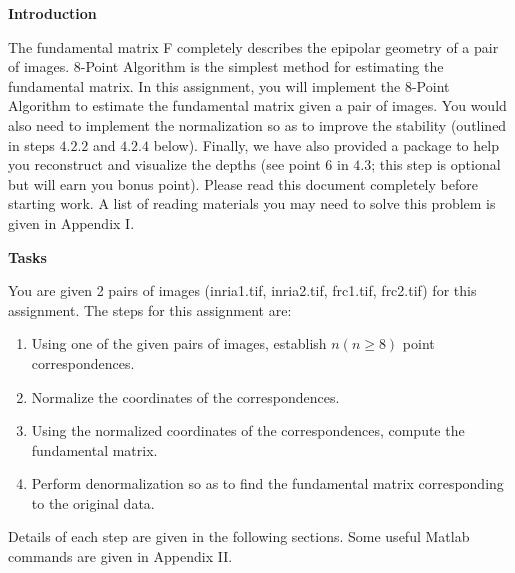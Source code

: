 \begin{questions}
\question
\textbf{Introduction}

The fundamental matrix F completely describes the epipolar geometry of a pair of images. 8-Point Algorithm is the simplest method for estimating the fundamental matrix. In this assignment, you will implement the 8-Point Algorithm to estimate the fundamental matrix given a pair of images. You would also need to implement the normalization so as to improve the stability (outlined in steps $4.2.2$ and $4.2.4$ below). Finally, we have also provided a package to help you reconstruct and visualize the depths (see point $6$ in $4.3$; this step is optional but will earn you bonus point). Please read this document completely before starting work. A list of reading materials you may need to solve this problem is given in Appendix I.

\question
\textbf{Tasks}

You are given 2 pairs of images (inria1.tif, inria2.tif, frc1.tif, frc2.tif) for this assignment. The steps for this assignment are:
\begin{enumerate}
    \item 
    Using one of the given pairs of images, establish $n (n \geq 8)$ point correspondences.
    
    \item
    Normalize the coordinates of the correspondences.
    
    \item
    Using the normalized coordinates of the correspondences, compute the fundamental matrix.
    
    \item
    Perform denormalization so as to find the fundamental matrix corresponding to the original data.
\end{enumerate}
Details of each step are given in the following sections. Some useful Matlab commands are given in Appendix II.

\end{questions}
